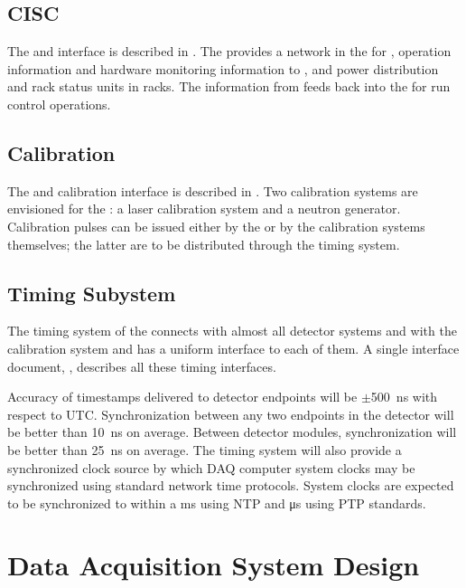 \subsection{CISC}

\label{sec:sp-daq:interfaces-cisc}
The  and  interface is described in
. The  provides a network in the  for ,  operation information and hardware
monitoring information to , and power distribution and
rack status units in  racks. The information from 
feeds back into the  for run control operations.

\subsection{Calibration}

The  and calibration interface is described in
. Two calibration systems are envisioned for the
: a laser calibration system and a neutron
generator. Calibration pulses can be issued either by the  or by
the calibration systems themselves;  %
the latter are to be distributed through the
 timing system.

\subsection{Timing Subystem}

The timing system of the   connects with
almost all detector systems and with the calibration system and has a uniform interface to each of
them.
A single interface document,
, describes all these timing interfaces. 

Accuracy of timestamps delivered to  detector endpoints will be $\pm$\SI{500}{\nano\second} with respect to UTC.  Synchronization between any two endpoints in the detector will be better than \SI{10}{\nano\second} on average.   Between detector modules, synchronization will be better than \SI{25}{\nano\second} on average.  The timing system will also provide a synchronized clock source by which DAQ computer system clocks may be synchronized using standard network time protocols.  System clocks are expected to be synchronized to within a \si{\milli\second} using NTP and \si{\micro\second} using PTP standards. 


\section{Data Acquisition System Design}
\label{sec:fd-daq:design}

